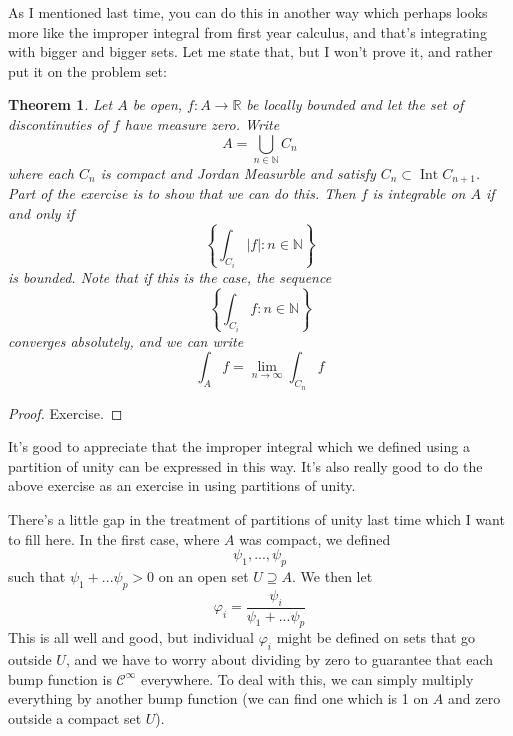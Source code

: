 \documentclass{article}
\newtheorem{theorem}{Theorem}
\DeclareMathOperator{\Int}{Int}
\newcommand{\reals}[0]{\mathbb{R}}
\newcommand{\nats}[0]{\mathbb{N}}
\newcommand{\mc}[1]{\mathcal{#1}}
\begin{document}
As I mentioned last time, you can do this in another way which perhaps looks more like the improper integral from first year calculus, and that's integrating with bigger and bigger sets. Let me state that, but I won't prove it, and rather put it on the problem set:
\begin{theorem}
  Let \(A\) be open, \(f: A \to \reals\) be locally bounded and let the set of discontinuties of \(f\) have measure zero. Write
  \begin{equation}
    A = \bigcup_{n \in \nats}C_n
  \end{equation}
  where each \(C_n\) is compact and Jordan Measurble and satisfy \(C_n \subset \Int C_{n + 1}\). Part of the exercise is to show that we can do this. Then \(f\) is integrable on \(A\) if and only if
  \begin{equation}
    \left\{\int_{C_i}|f| : n \in \nats\right\}
  \end{equation}
  is bounded. Note that if this is the case, the sequence
  \begin{equation}
    \left\{\int_{C_i}f : n \in \nats\right\}
  \end{equation}
  converges absolutely, and we can write
  \begin{equation}
    \int_Af = \lim_{n \to \infty}\int_{C_n}f
  \end{equation}
\end{theorem}
\begin{proof}
  Exercise.
\end{proof}
It's good to appreciate that the improper integral which we defined using a partition of unity can be expressed in this way. It's also really good to do the above exercise as an exercise in using partitions of unity.

There's a little gap in the treatment of partitions of unity last time which I want to fill here. In the first case, where \(A\) was compact, we defined
\begin{equation}
  \psi_1,...,\psi_p
\end{equation}
such that \(\psi_1 + ... \psi_p > 0\) on an open set \(U \supseteq A\). We then let
\begin{equation}
  \varphi_i = \frac{\psi_i}{\psi_1 + ... \psi_p}
\end{equation}
This is all well and good, but individual \(\varphi_i\) might be defined on sets that go outside \(U\), and we have to worry about dividing by zero to guarantee that each bump function is \(\mc{C}^\infty\) everywhere. To deal with this, we can simply multiply everything by another bump function (we can find one which is 1 on \(A\) and zero outside a compact set \(U\)).
\end{document}

